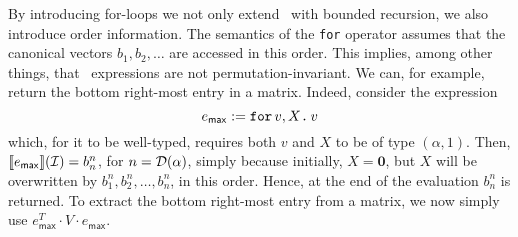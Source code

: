 By introducing for-loops we not only extend \lang\ with bounded recursion, we also introduce order information. 
The semantics of the \texttt{for} operator assumes that the canonical vectors $b_1,b_2,\ldots$
are accessed in this order. This implies, among other things, that \langfor\ expressions are not permutation-invariant.
We can, for example, return the bottom right-most entry in a matrix. Indeed, consider the expression 
$$
e_{\mathsf{max}} := \texttt{for}\, v,X \texttt{.}\, v
$$
which, for it to be well-typed, requires both $v$ and $X$ to be of type $(\alpha,1)$. Then, $\llbracket e_{\mathsf{max}} \rrbracket(\mathcal{I})=b_n^n$, for $n=\mathcal{D}(\alpha)$, simply because initially, $X=\mathbf{0}$, but $X$ will be overwritten by $b_1^n,b_2^n,\ldots,b_n^n$, in this order. Hence, at the end of the evaluation $b_n^n$ is returned.
To extract the bottom right-most entry from a matrix, we now simply use $e_{\mathsf{max}}^T\cdot V\cdot e_{\mathsf{max}}$.



